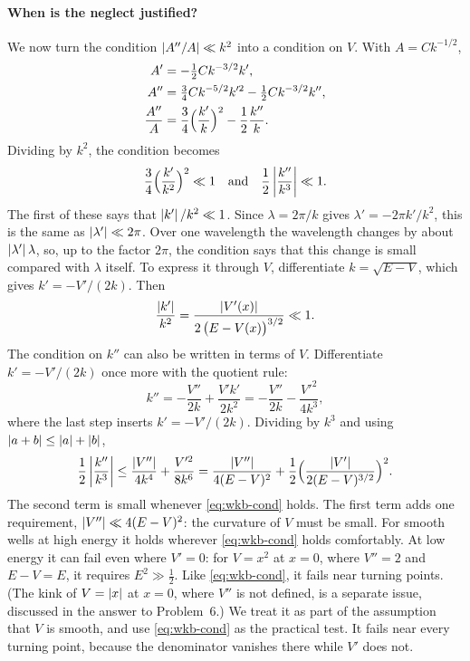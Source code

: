 \paragraph{When is the neglect justified?} We now turn the condition $\left\lvert A''/A\right\rvert\ll k^2$ into a condition on $V$. With $A=Ck^{-1/2}$,
\begin{align}
A' &= -\tfrac12 C k^{-3/2}k',\\
A'' &= \tfrac34 C k^{-5/2}k'^2-\tfrac12 C k^{-3/2}k'',\\
\frac{A''}{A} &= \frac34\Bigl(\frac{k'}{k}\Bigr)^2-\frac12\frac{k''}{k}.
\end{align}
Dividing by $k^2$, the condition becomes
\begin{equation}
\frac34\Bigl(\frac{k'}{k^2}\Bigr)^2\ll1\quad\text{and}\quad\frac12\left\lvert \frac{k''}{k^3}\right\rvert\ll1.
\end{equation}
The first of these says that $\left\lvert k'\right\rvert/k^2\ll1$. Since $\lambda=2\pi/k$ gives $\lambda'=-2\pi k'/k^2$, this is the same as $\left\lvert \lambda'\right\rvert\ll2\pi$. Over one wavelength the wavelength changes by about $\left\lvert \lambda'\right\rvert\lambda$, so, up to the factor $2\pi$, the condition says that this change is small compared with $\lambda$ itself. To express it through $V$, differentiate $k=\sqrt{E-V}$, which gives $k'=-V'/(2k)$. Then
\begin{equation}
\frac{\left\lvert k'\right\rvert}{k^2}=\frac{\left\lvert V'(x)\right\rvert}{2\,\bigl(E-V(x)\bigr)^{3/2}}\ll1.
\label{eq:wkb-cond}
\end{equation}
The condition on $k''$ can also be written in terms of $V$. Differentiate $k'=-V'/(2k)$ once more with the quotient rule:
\begin{equation}
k''=-\frac{V''}{2k}+\frac{V'k'}{2k^2}=-\frac{V''}{2k}-\frac{V'^2}{4k^3},
\end{equation}
where the last step inserts $k'=-V'/(2k)$. Dividing by $k^3$ and using $\left\lvert a+b\right\rvert\le\left\lvert a\right\rvert+\left\lvert b\right\rvert$,
\begin{equation}
\frac12\left\lvert \frac{k''}{k^3}\right\rvert\le\frac{\left\lvert V''\right\rvert}{4k^4}+\frac{V'^2}{8k^6}=\frac{\left\lvert V''\right\rvert}{4(E-V)^2}+\frac12\Bigl(\frac{\left\lvert V'\right\rvert}{2(E-V)^{3/2}}\Bigr)^2 .
\end{equation}
The second term is small whenever \cref{eq:wkb-cond} holds. The first term adds one requirement, $\left\lvert V''\right\rvert\ll4(E-V)^2$: the curvature of $V$ must be small. For smooth wells at high energy it holds wherever \cref{eq:wkb-cond} holds comfortably. At low energy it can fail even where $V'=0$: for $V=x^2$ at $x=0$, where $V''=2$ and $E-V=E$, it requires $E^2\gg\tfrac12$. Like \cref{eq:wkb-cond}, it fails near turning points. (The kink of $V=\left\lvert x\right\rvert$ at $x=0$, where $V''$ is not defined, is a separate issue, discussed in the answer to Problem~6.) We treat it as part of the assumption that $V$ is smooth, and use \cref{eq:wkb-cond} as the practical test. It fails near every turning point, because the denominator vanishes there while $V'$ does not.

